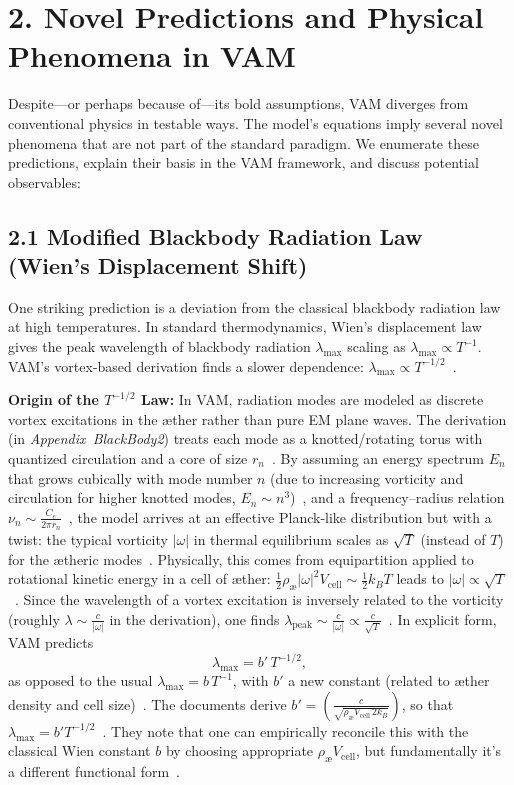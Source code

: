 \documentclass[a4paper,12pt]{article}
\begin{document}
\section*{2. Novel Predictions and Physical Phenomena in VAM}

Despite---or perhaps because of---its bold assumptions, VAM diverges from conventional physics in testable ways. The model's equations imply several novel phenomena that are not part of the standard paradigm. We enumerate these predictions, explain their basis in the VAM framework, and discuss potential observables:

\subsection*{2.1 Modified Blackbody Radiation Law (Wien's Displacement Shift)}

One striking prediction is a deviation from the classical blackbody radiation law at high temperatures. In standard thermodynamics, Wien's displacement law gives the peak wavelength of blackbody radiation $\lambda_{\text{max}}$ scaling as $\lambda_{\text{max}}\propto T^{-1}$. VAM's vortex-based derivation finds a slower dependence: $\lambda_{\text{max}} \propto T^{-1/2}$~\cite{vamblackbody}.

\textbf{Origin of the $T^{-1/2}$ Law:} In VAM, radiation modes are modeled as discrete vortex excitations in the æther rather than pure EM plane waves. The derivation (in \textit{Appendix~BlackBody2}) treats each mode as a knotted/rotating torus with quantized circulation and a core of size $r_n$~\cite{vamblackbody}. By assuming an energy spectrum $E_n$ that grows cubically with mode number $n$ (due to increasing vorticity and circulation for higher knotted modes, $E_n \sim n^3$)~\cite{vamblackbody}, and a frequency--radius relation $\nu_n \sim \frac{C_e}{2\pi r_n}$~\cite{vamblackbody}, the model arrives at an effective Planck-like distribution but with a twist: the typical vorticity $|\omega|$ in thermal equilibrium scales as $\sqrt{T}$ (instead of $T$) for the ætheric modes~\cite{vamblackbody}. Physically, this comes from equipartition applied to rotational kinetic energy in a cell of æther: $\frac{1}{2}\rho_{\text{\ae}}|\omega|^2 V_{\text{cell}}\sim \frac{1}{2}k_B T$ leads to $|\omega|\propto \sqrt{T}$~\cite{vamblackbody}. Since the wavelength of a vortex excitation is inversely related to the vorticity (roughly $\lambda \sim \frac{c}{|\omega|}$ in the derivation), one finds $\lambda_{\text{peak}} \sim \frac{c}{|\omega|} \propto \frac{c}{\sqrt{T}}$~\cite{vamblackbody}. In explicit form, VAM predicts
\begin{equation}
    \lambda_{\text{max}} = b'\,T^{-1/2},
\end{equation}
as opposed to the usual $\lambda_{\text{max}} = b\,T^{-1}$, with $b'$ a new constant (related to æther density and cell size)~\cite{vamblackbody}. The documents derive $b' = \left(\frac{c}{\sqrt{\rho_{\text{\ae}}V_{\text{cell}}\,2k_B}}\right)$, so that $\lambda_{\max}=b' T^{-1/2}$~\cite{vamblackbody}. They note that one can empirically reconcile this with the classical Wien constant $b$ by choosing appropriate $\rho_{\text{\ae}}V_{\text{cell}}$, but fundamentally it's a different functional form~\cite{vamblackbody}.
\end{document}
